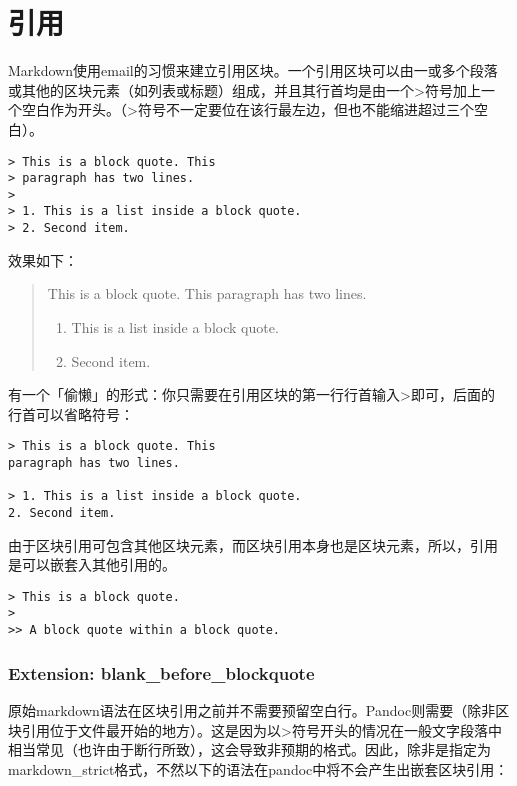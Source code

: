 \documentclass[fancyhdr,bookmark]{ctexbook}
\providecommand{\tightlist}{%
  \setlength{\itemsep}{0pt}\setlength{\parskip}{0pt}}
\begin{document}
\hypertarget{ux5f15ux7528}{%
\section{引用}\label{ux5f15ux7528}}

Markdown使用email的习惯来建立引用区块。一个引用区块可以由一或多个段落
或其他的区块元素（如列表或标题）组成，并且其行首均是由一个\textgreater 符号加上一
个空白作为开头。（\textgreater 符号不一定要位在该行最左边，但也不能缩进超过三个空白）。

\begin{lstlisting}
> This is a block quote. This
> paragraph has two lines.
>
> 1. This is a list inside a block quote.
> 2. Second item.
\end{lstlisting}

效果如下：

\begin{quote}
This is a block quote. This paragraph has two lines.

\begin{enumerate}
\def\labelenumi{\arabic{enumi}.}
\tightlist
\item
  This is a list inside a block quote.
\item
  Second item.
\end{enumerate}
\end{quote}

有一个「偷懒」的形式：你只需要在引用区块的第一行行首输入\textgreater 即可，后面的
行首可以省略符号：

\begin{lstlisting}
> This is a block quote. This
paragraph has two lines.

> 1. This is a list inside a block quote.
2. Second item.
\end{lstlisting}

由于区块引用可包含其他区块元素，而区块引用本身也是区块元素，所以，引用
是可以嵌套入其他引用的。

\begin{lstlisting}
> This is a block quote.
>
>> A block quote within a block quote.
\end{lstlisting}

\hypertarget{extension-blank_before_blockquote}{%
\subsubsection{Extension:
blank\_before\_blockquote}\label{extension-blank_before_blockquote}}

原始markdown语法在区块引用之前并不需要预留空白行。Pandoc则需要（除非区
块引用位于文件最开始的地方）。这是因为以\textgreater 符号开头的情况在一般文字段落中
相当常见（也许由于断行所致），这会导致非预期的格式。因此，除非是指定为
markdown\_strict格式，不然以下的语法在pandoc中将不会产生出嵌套区块引用：
\end{document}
